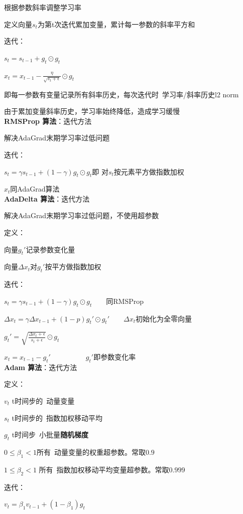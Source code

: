 \documentclass[UTF8]{ctexart}
\begin{document}
  根据参数斜率调整学习率

  定义向量$s_t$为第t次迭代累加变量，累计每一参数的斜率平方和

  迭代：

  \quad $s_t = s_{t-1} + g_t \odot g_t$

  \quad $x_t = x_{t-1} - \frac{\eta}{\sqrt{s_t + \epsilon } } \odot g_t$

  \quad \quad 即每一参数有变量记录所有斜率历史，每次迭代时\ 学习率/斜率历史l2 norm

  由于累加变量斜率历史，学习率始终降低，造成学习缓慢\\
\textbf{RMSProp 算法}：迭代方法

  解决AdaGrad末期学习率过低问题

  迭代：
  
  \quad $s_t = \gamma s_{t-1} + (1-\gamma)g_t \odot g_t$即 对$s_t$按元素平方做指数加权

  \quad $x_t$同AdaGrad算法\\
\textbf{AdaDelta 算法}：迭代方法

  解决AdaGrad末期学习率过低问题，不使用超参数

  定义：

  \quad 向量$g_t'$记录参数变化量

  \quad 向量$\varDelta x_t$对$g_t'$按平方做指数加权

  迭代：

  \quad $s_t = \gamma s_{t-1} + (1-\gamma)g_t \odot g_t$\ \ \ \ 同RMSProp

  \quad $\varDelta x_t = \gamma \varDelta x_{t-1} + (1-p)g_t' \odot g_t'$\ \ \ \ $\varDelta x_t$初始化为全零向量

  \quad $g_t' = \sqrt{\frac{\varDelta x_t + \epsilon }{s_t + \epsilon }} \odot g_t $

  \quad $x_t = x_{t-1} - g_t'$\ \ \ \ \ \ \ \ \ \ $g_t'$即参数变化率\\
\textbf{Adam 算法}：迭代方法

  定义：

  \quad $v_t$ t时间步的\ 动量变量

  \quad $s_t$ t时间步的\ 指数加权移动平均

  \quad $g_t$ t时间步\ 小批量\textbf{随机梯度}

  \quad $0\leq \beta_1<1$所有\ 动量变量的权重超参数。常取$0.9$
  
  \quad $1\leq \beta_2<1$ 所有\ 指数加权移动平均变量超参数。常取$0.999$

  迭代：

  \quad $v_t = \beta_1v_{t-1} + (1 -\beta_1)g_t$
\end{document}
